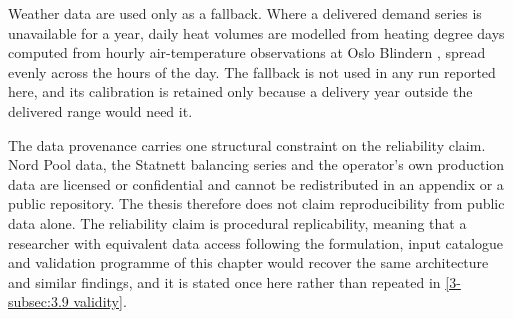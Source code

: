 Weather data are used only as a fallback. Where a delivered demand series is unavailable for a year, daily heat volumes are modelled from heating degree days computed from hourly air-temperature observations at Oslo Blindern \cite{norsk_klima_service_senter_observasjoner_nodate}, spread evenly across the hours of the day. The fallback is not used in any run reported here, and its calibration is retained only because a delivery year outside the delivered range would need it.

The data provenance carries one structural constraint on the reliability claim. Nord Pool data, the Statnett balancing series and the operator's own production data are licensed or confidential and cannot be redistributed in an appendix or a public repository. The thesis therefore does not claim reproducibility from public data alone. The reliability claim is procedural replicability, meaning that a researcher with equivalent data access following the formulation, input catalogue and validation programme of this chapter would recover the same architecture and similar findings, and it is stated once here rather than repeated in \autoref{3-subsec:3.9 validity}.

